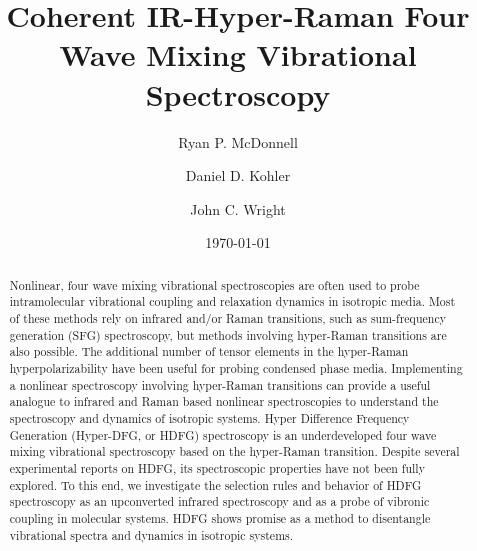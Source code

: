 \documentclass[aip, jcp, reprint, twocolumn]{revtex4-2}
\begin{document}
\title{Coherent IR-Hyper-Raman Four Wave Mixing Vibrational Spectroscopy}


\author{Ryan P. McDonnell} 
\author{Daniel D. Kohler}
\author{John C. Wright} 


\date{\today}

\begin{abstract}
Nonlinear, four wave mixing vibrational spectroscopies are often used to probe intramolecular vibrational coupling and relaxation dynamics in isotropic media.
Most of these methods rely on infrared and/or Raman transitions, such as sum-frequency generation (SFG) spectroscopy, but methods involving hyper-Raman transitions are also possible. 
The additional number of tensor elements in the hyper-Raman hyperpolarizability have been useful for probing condensed phase media. 
Implementing a nonlinear spectroscopy involving hyper-Raman transitions can provide a useful analogue to infrared and Raman based nonlinear spectroscopies to understand the spectroscopy and dynamics of isotropic systems.
Hyper Difference Frequency Generation (Hyper-DFG, or HDFG) spectroscopy is an underdeveloped four wave mixing vibrational spectroscopy based on the hyper-Raman transition. 
Despite several experimental reports on HDFG, its spectroscopic properties have not been fully explored.  
To this end, we investigate the selection rules and behavior of HDFG spectroscopy as an upconverted infrared spectroscopy and as a probe of vibronic coupling in molecular systems.
HDFG shows promise as a method to disentangle vibrational spectra and dynamics in isotropic systems.

\end{abstract}

\maketitle
\end{document}
